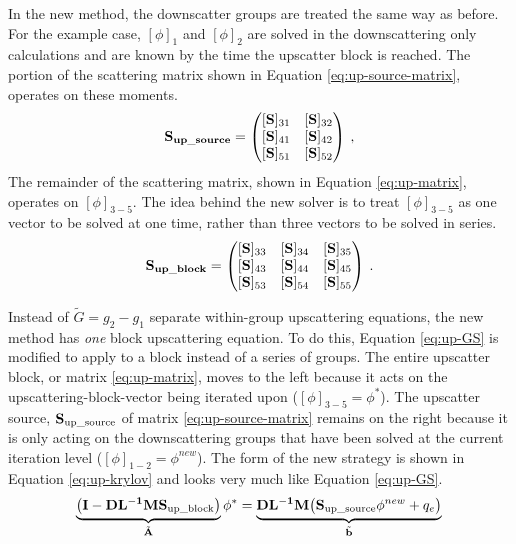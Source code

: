 In the new method, the downscatter groups are treated the same way as before. For the example case, $[\phi]_{1}$ and $[\phi]_{2}$ are solved in the downscattering only calculations and are known by the time the upscatter block is reached. The portion of the scattering matrix shown in Equation \eqref{eq:up-source-matrix}, operates on these moments. 
%
 \begin{equation}
  \mathbf{S_{up\_source}}  =     \begin{pmatrix}
      [\ve{S}]_{31} & [\ve{S}]_{32}  \\
      [\ve{S}]_{41} & [\ve{S}]_{42}  \\
      [\ve{S}]_{51} & [\ve{S}]_{52} 
    \end{pmatrix} \:,
    \label{eq:up-source-matrix} 
 \end{equation}
%
The remainder of the scattering matrix, shown in Equation \eqref{eq:up-matrix}, operates on $[\phi]_{3-5}$. The idea behind the new solver is to treat $[\phi]_{3-5}$ as one vector to be solved at one time, rather than three vectors to be solved in series. 
%
 \begin{equation}
  \mathbf{S_{up\_block}}  =     \begin{pmatrix}
      [\ve{S}]_{33} & [\ve{S}]_{34} & [\ve{S}]_{35} \\
      [\ve{S}]_{43} & [\ve{S}]_{44} & [\ve{S}]_{45} \\
      [\ve{S}]_{53} & [\ve{S}]_{54} & [\ve{S}]_{55}
    \end{pmatrix} \:.
    \label{eq:up-matrix}
\end{equation}

Instead of $\tilde{G} = g_{2 }- g_{1}$ separate within-group upscattering equations, the new method has \emph{one} block upscattering equation. To do this, Equation \eqref{eq:up-GS} is modified to apply to a block instead of a series of groups. The entire upscatter block, or matrix \eqref{eq:up-matrix}, moves to the left because it acts on the upscattering-block-vector being iterated upon ($[\phi]_{3-5} = \phi^{*}$). The upscatter source, $\mathbf{S}_{\text{up\_source}}$ of matrix \eqref{eq:up-source-matrix} remains on the right because it is only acting on the downscattering groups that have been solved at the current iteration level ($[\phi]_{1-2} = \phi^{new}$). The form of the new strategy is shown in Equation \eqref{eq:up-krylov} and looks very much like Equation \eqref{eq:up-GS}.
%
\begin{equation}
 \underbrace{ \bigl( \mathbf{I} - \mathbf{DL^{-1}}\mathbf{M}\mathbf{S}_{\text{up\_block}} \bigr)}_{\tilde{\mathbf{A}}} \phi^{*} = \underbrace{ \mathbf{DL^{-1}}\mathbf{M} \bigl( \mathbf{S}_{\text{up\_source}}\phi^{new} + q_{e} \bigr)}_{\tilde{\mathbf{b}}}  \label{eq:up-krylov} \\
\end{equation}

